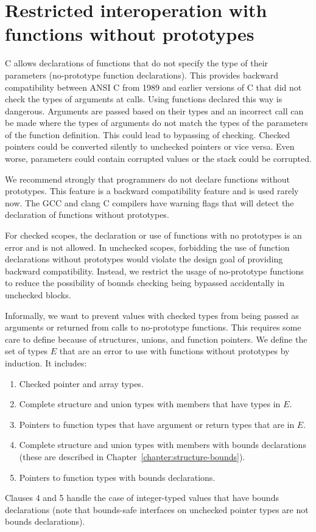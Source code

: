 \section{Restricted interoperation with functions without prototypes}
C allows declarations of functions that do not specify the type of their parameters
(no-prototype function declarations).  This provides backward compatibility between
ANSI C from 1989 and earlier versions of C that did not check the types of
arguments at calls.  Using functions declared this way is
dangerous.  Arguments are passed based on their types and an incorrect call can be made
where the types of arguments do not match the types of the parameters of the function
definition.  This could lead to bypassing of checking.  Checked pointers could be 
converted silently to unchecked pointers or vice versa.  Even worse, parameters could contain
corrupted values or the stack could be corrupted.

We recommend strongly that programmers do not declare functions without prototypes.  This
feature is a backward compatibility feature and is used rarely now.
The GCC and clang C compilers have warning flags that will detect the declaration of functions without 
prototypes.

For checked scopes, the declaration or use of functions with no prototypes is an error
and is not allowed.   In unchecked scopes, forbidding the use of function
declarations without prototypes would violate the design goal of providing backward compatibility.
Instead, we restrict the usage of no-prototype functions to reduce the possibility of
bounds checking being bypassed accidentally in unchecked blocks.

Informally, we want to prevent values with checked types from being passed as arguments or
returned from calls to no-prototype functions.  This requires some care to define because of
structures, unions, and function pointers. We define the set of types $E$ that are an error to use
with functions without prototypes by induction.  It includes:
\begin{enumerate}
\item Checked pointer and array types.
\item Complete structure and union types with members that have types in $E$.
\item Pointers to function types that have argument or return types that are in $E$.
\item Complete structure and union types with members with bounds declarations (these
      are described in Chapter~\ref{chapter:structure-bounds}).
\item Pointers to function types with bounds declarations.
\end{enumerate}
Clauses 4 and 5 handle the case of integer-typed values that have bounds declarations
(note that bounds-safe interfaces on unchecked pointer types are not bounds declarations).

